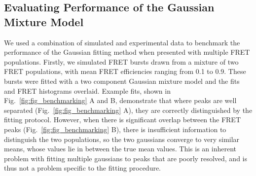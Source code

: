 \subsection{Evaluating Performance of the Gaussian Mixture Model}
We used a combination of simulated and experimental data to benchmark the performance of the Gaussian fitting method when presented with multiple FRET populations. Firstly, we simulated FRET bursts drawn from a mixture of two FRET populations, with mean FRET efficiencies ranging from 0.1 to 0.9. These bursts were fitted with a two component Gaussian mixture model and the fits and FRET histograms overlaid. Example fits, shown in Fig.~\ref{fig:fig_benchmarking} A and B, demonstrate that where peaks are well separated (Fig.~\ref{fig:fig_benchmarking} A), they are correctly distinguished by the fitting protocol. However, when there is significant overlap between the FRET peaks (Fig.~\ref{fig:fig_benchmarking} B), there is insufficient information to distinguish the two populations, so the two gaussians converge to very similar means, whose values lie in between the true mean values. This is an inherent problem with fitting multiple gaussians to peaks that are poorly resolved, and is thus not a problem specific to the fitting procedure.

